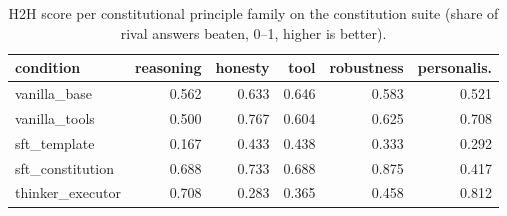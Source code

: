 \begin{table}[t]
  \centering
  \caption{H2H score per constitutional principle family on the constitution suite (share of rival answers beaten, 0--1, higher is better).}
  \label{tab:rank-families}
  \begin{tabular}{lrrrrr}
    \toprule
    condition & reasoning & honesty & tool & robustness & personalis. \\
    \midrule
    vanilla\_base & 0.562 & 0.633 & 0.646 & 0.583 & 0.521 \\
    vanilla\_tools & 0.500 & 0.767 & 0.604 & 0.625 & 0.708 \\
    sft\_template & 0.167 & 0.433 & 0.438 & 0.333 & 0.292 \\
    sft\_constitution & 0.688 & 0.733 & 0.688 & 0.875 & 0.417 \\
    thinker\_executor & 0.708 & 0.283 & 0.365 & 0.458 & 0.812 \\
    \bottomrule
  \end{tabular}
\end{table}
